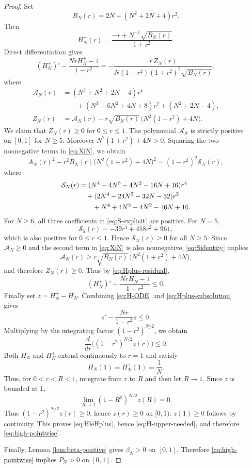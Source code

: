 \documentclass[10pt,a4paper]{amsart}
\begin{document}
\begin{proof}
Set
\[
 B_N(r)=2N+(N^2+2N+4)r^2.
\]
Then
\[
 H_N^+(r)=\frac{-r+N^{-1}\sqrt{B_N(r)}}{1+r^2}.
\]
Direct differentiation gives
\begin{equation}\label{eq:Hplus-residual}
 (H_N^+)'-\frac{NrH_N^+-1}{1-r^2}
 =-\frac{r\,Z_N(r)}{N(1-r^2)(1+r^2)^2\sqrt{B_N(r)}},
\end{equation}
where
\begin{align}
 \mathcal A_N(r)
 &=(N^3+N^2+2N-4)r^4\label{eq:AcalN}\\ 
 &\qquad+(N^3+6N^2+4N+8)r^2
 +(N^2+2N-4),\\
 Z_N(r)
 &=\mathcal A_N(r)
 -r\sqrt{B_N(r)}\,\bigl(N^2(1+r^2)+4N\bigr).\label{eq:XiN}
\end{align}
We claim that $Z_N(r) \geq 0$ for $0 \leq r \leq 1$.
The polynomial $\mathcal A_N$ is strictly positive on $[0,1]$ for $N\ge5$.  Moreover $N^2(1+r^2)+4N>0$. Squaring the two nonnegative terms in \eqref{eq:XiN}, we obtain 
\begin{equation}\label{eq:Sidentity}
 A_N(r)^2
 -r^2B_N(r)\bigl(N^2(1+r^2)+4N\bigr)^2
=(1-r^2)^2\mathcal S_N(r),
\end{equation}
where
\begin{align}
 \mathcal S_N(r)
 &=(N^4-4N^3-4N^2-16N+16)r^4 \notag\\
 &\quad +(2N^4-24N^2-32N-32)r^2
 \\
 &\qquad+N^4+4N^3-4N^2-16N+16.\label{eq:S-explicit}
\end{align}
For $N\ge6$, all three coefficients in \eqref{eq:S-explicit} are positive.  For $N=5$,
\[
 \mathcal S_5(r)=-39r^4+458r^2+961,
\]
which is also positive for $0\le r\le1$.  Hence $\mathcal S_N(r)\ge0$ for all $N\ge5$.  Since $\mathcal A_N\ge0$ and the second term in \eqref{eq:XiN} is also nonnegative, \eqref{eq:Sidentity} implies
\[
 \mathcal A_N(r)
 \ge r\sqrt{B_N(r)}\,\bigl(N^2(1+r^2)+4N\bigr),
\]
and therefore $Z_N(r)\ge0$.  Thus by \eqref{eq:Hplus-residual},
\begin{equation}\label{eq:Hplus-subsolution}
 (H_N^+)'-\frac{NrH_N^+-1}{1-r^2}\le0.
\end{equation}
Finally set $z=H_N^+-H_N$.  Combining \eqref{eq:H-ODE} and \eqref{eq:Hplus-subsolution} gives
\[
 z'-\frac{Nr}{1-r^2}z\le0.
\]
Multiplying by the integrating factor $(1-r^2)^{N/2}$, we obtain
\[
 \frac{d}{dr}\Big((1-r^2)^{N/2}z(r)\Big)\le0.
\]
Both $H_N$ and $H_N^+$ extend continuously to $r=1$ and satisfy
\[
 H_N(1)=H_N^+(1)=\frac1N.
\]
Thus, for $0<r<R<1$, integrate from $r$ to $R$ and then let $R\to 1$.  Since $z$ is bounded at $1$,
\[
 \lim_{R\to 1}(1-R^2)^{N/2}z(R)=0.
\]
Thus $(1-r^2)^{N/2}z(r)\ge0$, hence $z(r)\ge0$ on $[0,1)$. $z(1)\ge 0$ follows by continuity.  This proves \eqref{eq:HleHplus}, hence \eqref{eq:H-upper-needed}, and therefore \eqref{eq:high-pointwise}.  

Finally, Lemma \ref{lem:beta-positive} gives $\beta_N>0$ on $[0,1]$.  Therefore \eqref{eq:high-pointwise} implies $P_N>0$ on $[0,1]$.
\end{proof}
\end{document}

